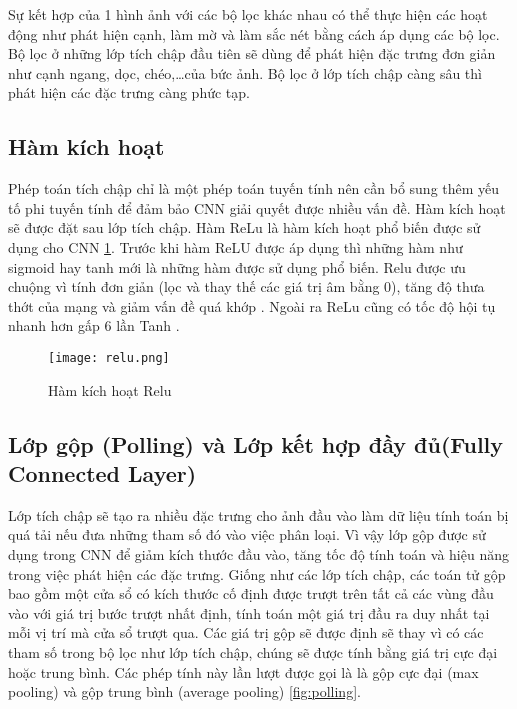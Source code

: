 \documentclass[../the.tex]{subfiles}
\begin{document}
{\fontsize{13}{12} \selectfont
Sự kết hợp của 1 hình ảnh với các bộ lọc khác nhau có thể thực hiện các hoạt động như phát hiện cạnh, làm mờ và làm sắc nét bằng cách áp dụng các bộ lọc.
Bộ lọc ở những lớp tích chập đầu tiên sẽ dùng để phát hiện đặc trưng đơn giản như cạnh ngang, dọc, chéo,\dots của bức ảnh. Bộ lọc ở lớp tích chập càng sâu thì phát hiện các đặc trưng càng phức tạp.
}


\subsection{Hàm kích hoạt}

{\fontsize{13}{12} \selectfont
	Phép toán tích chập chỉ là một phép toán tuyến tính nên cần bổ sung thêm yếu tố phi tuyến tính để đảm bảo CNN giải quyết được nhiều vấn đề.
	Hàm kích hoạt sẽ được đặt sau lớp tích chập.
	Hàm ReLu \cite{nair2010rectified} là hàm kích hoạt phổ biến được sử dụng cho CNN  \ref{fig:relu}. Trước khi hàm ReLU được áp dụng thì những hàm như sigmoid hay tanh mới là những hàm được sử dụng phổ biến.
	Relu được ưu chuộng vì tính đơn giản (lọc và thay thế các giá trị âm bằng 0), tăng độ thưa thớt của mạng và giảm vấn đề quá khớp \cite{caruana2000overfitting}.
	Ngoài ra ReLu cũng có tốc độ hội tụ nhanh hơn gấp 6 lần Tanh \cite{krizhevsky2012imagenet}.
}

\begin{figure}[H]
	\centering
	\texttt{[image: relu.png]}
	\caption{Hàm kích hoạt Relu}
	\label{fig:relu}
\end{figure}

\subsection{Lớp gộp (Polling) và Lớp kết hợp đầy đủ(Fully Connected Layer)}

{\fontsize{13}{12} \selectfont
	Lớp tích chập sẽ tạo ra nhiều đặc trưng cho ảnh đầu vào làm dữ liệu tính toán bị quá tải nếu đưa những tham số đó vào việc phân loại.
	Vì vậy lớp gộp được sử dụng trong CNN để giảm kích thước đầu vào, tăng tốc độ tính toán và hiệu năng trong việc phát hiện các đặc trưng.
	Giống như các lớp tích chập, các toán tử gộp bao gồm một cửa sổ có kích thước cố định được trượt trên tất cả các vùng đầu vào với giá trị bước trượt nhất định, tính toán một giá trị đầu ra duy nhất tại mỗi vị trí mà cửa sổ trượt qua.
	Các giá trị gộp sẽ được định sẽ thay vì có các tham số trong bộ lọc như lớp tích chập, chúng sẽ được tính bằng giá trị cực đại hoặc trung bình.
	Các phép tính này lần lượt được gọi là là gộp cực đại (max pooling) và gộp trung bình (average pooling) \ref{fig:polling}.
}
\end{document}
